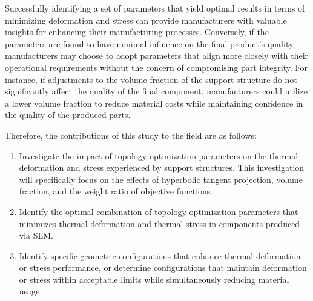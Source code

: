 \documentclass[../main.tex]{subfiles}
\begin{document}
Successfully identifying a set of parameters that yield optimal results in terms of minimizing deformation and stress can provide manufacturers with valuable insights for enhancing their manufacturing processes. Conversely, if the parameters are found to have minimal influence on the final product's quality, manufacturers may choose to adopt parameters that align more closely with their operational requirements without the concern of compromising part integrity. For instance, if adjustments to the volume fraction of the support structure do not significantly affect the quality of the final component, manufacturers could utilize a lower volume fraction to reduce material costs while maintaining confidence in the quality of the produced parts.

Therefore, the contributions of this study to the field are as follows:
\begin{enumerate}
\item Investigate the impact of topology optimization parameters on the thermal deformation and stress experienced by support structures. This investigation will specifically focus on the effects of hyperbolic tangent projection, volume fraction, and the weight ratio of objective functions.
\item Identify the optimal combination of topology optimization parameters that minimizes thermal deformation and thermal stress in components produced via SLM.
\item Identify specific geometric configurations that enhance thermal deformation or stress performance, or determine configurations that maintain deformation or stress within acceptable limits while simultaneously reducing material usage.



\end{enumerate}
\end{document}
